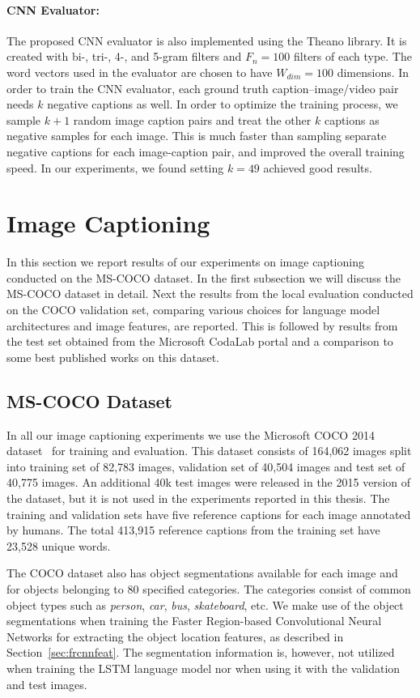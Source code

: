 \paragraph*{CNN Evaluator:} The proposed CNN evaluator is also implemented using
the Theano library. 
It is created with bi-, tri-, 4-, and 5-gram filters and $F_n=100$
filters of each type.
The word vectors used in the evaluator are chosen to have $W_{dim}=100$ dimensions.
In order to train the CNN evaluator, each ground truth caption--image/video pair
needs $k$ negative captions as well.
In order to optimize the training process, we sample $k+1$ random image caption
pairs and treat the other $k$ captions as negative samples for each image.
This is much faster than sampling separate negative captions for each
image-caption pair, and improved the overall training speed.
In our experiments, we found setting $k=49$ achieved good results.

\section{Image Captioning}

In this section we report results of our experiments on image captioning
conducted on the MS-COCO dataset.
In the first subsection we will discuss the MS-COCO dataset in detail.
Next the results from the local evaluation conducted on the COCO validation set,
comparing various choices for language model architectures and image features,
are reported.
This is followed by results from the test set obtained from the Microsoft
CodaLab portal and a comparison to some best published works on this dataset.

\subsection{MS-COCO Dataset}
In all our image captioning experiments we use the Microsoft COCO 2014
dataset~\cite{Lin2014} for training and evaluation.
This dataset consists of 164,062 images split into training set of 82,783
images, validation set of 40,504 images and test set of 40,775 images. 
An additional 40k test images were released in the 2015 version of the dataset,
but it is not used in the experiments reported in this thesis.
The training and validation sets have five reference captions for each image
annotated by humans. 
The total 413,915 reference captions from the training set have 23,528 unique
words.

The COCO dataset also has object segmentations available for each image and for
objects belonging to 80 specified categories.
The categories consist of common object types such as \emph{person}, \emph{car},
\emph{bus}, \emph{skateboard}, etc.
We make use of the object segmentations when training the Faster Region-based
Convolutional Neural Networks for extracting the object location features, as
described in Section~\ref{sec:frcnnfeat}.
The segmentation information is, however, not utilized when training the LSTM
language model nor when using it with the validation and test images.


